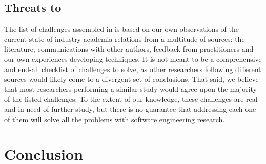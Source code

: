 \subsection{Threats to  }

The list of challenges assembled in  is based on our own observations of the current state of industry-academia relations from a multitude of sources: the literature, communications with other authors, feedback from practitioners and our own experiences developing techniques.
It is not meant to be a comprehensive and end-all checklist of challenges to solve, as other researchers following different sources would likely come to a divergent set of conclusions.
That said, we believe that most researchers performing a similar study would agree upon the majority of the listed challenges.
To the extent of our knowledge, these challenges are real and in need of further study, but there is no guarantee that addressing each one of them will solve all the problems with software engineering research.





%

\section{Conclusion}